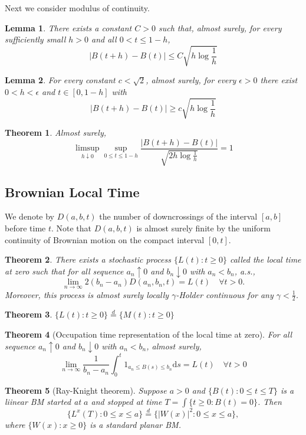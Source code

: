 \documentclass{article}
\newtheorem{Thm}{Theorem}[section]
\newtheorem{Lem}{Lemma}[section]
\theoremstyle{definition}
\renewcommand{\leq}{\leqslant}
\renewcommand{\geq}{\geqslant}
\newcommand{\<}{\left\langle}
\renewcommand{\>}{\right\rangle}
\newcommand{\ep}{{\epsilon}}
\begin{document}
Next we consider modulus of continuity.
\begin{Lem}
    There exists a constant $C>0$ such that, almost surely, for every sufficiently small $h>0$ and all $0<t\leq 1-h$,
    \[|B(t+h)-B(t)|\leq C\sqrt{h\log\frac{1}{h}}\]
\end{Lem}

\begin{Lem}
    For every constant $c<\sqrt{2}$, almost surely, for every $\ep>0$ there exist $0<h<\ep$ and $t\in [0,1-h]$ with 
    \[|B(t+h)-B(t)|\geq c\sqrt{h\log\frac{1}{h}}\]
\end{Lem}

\begin{Thm}
    Almost surely,
    \[\limsup_{h\downarrow 0}\sup_{0\leq t\leq 1-h}\frac{|B(t+h)-B(t)|}{\sqrt{2h\log\frac{1}{h}}}=1\]
\end{Thm}

\subsection{Brownian Local Time}
We denote by $D(a,b,t)$ the number of downcrossings of the interval $[a,b]$ before time $t$.
Note that $D(a,b,t)$ is almost surely finite by the uniform continuity of Brownian motion on the compact interval $[0,t]$.
\begin{Thm}
    There exists a stochastic process $\{L(t):t\geq 0\}$ called the local time at zero such that for all sequence $a_n\uparrow 0$ and $b_n\downarrow 0$ with 
    $a_n<b_n$, a.s.,
    \[\lim_{n\to\infty} 2(b_n-a_n)D(a_n,b_n,t)=L(t) \quad\forall t>0.\]
    Moreover, this process is almost surely locally $\gamma$-Holder continuous for any $\gamma<\frac{1}{2}$.
\end{Thm}

\begin{Thm}
    $\{L(t):t\geq 0\}\overset{d}{=}  \{M(t):t\geq 0\}$
\end{Thm}

\begin{Thm}[Occupation time representation of the local time at zero]
    For all sequence $a_n\uparrow 0$ and $b_n\downarrow 0$ with $a_n<b_n$, almost surely,
    \[\lim_{n\to\infty}\frac{1}{b_n-a_n}\int_0^t 1_{a_n\leq B(s)\leq b_n}\mathrm{d}s=L(t)\quad \forall t>0 \]
\end{Thm}


\begin{Thm}[Ray-Knight theorem]
    Suppose $a>0$ and $\{B(t):0\leq t\leq T\}$ is a liinear BM started at $a$ and stopped at time $T=\int\{t\geq 0:B(t)=0\}$.
    Then \[\{L^x(T):0\leq x\leq a\}\overset{d}{=}\{|W(x)|^2:0\leq x\leq a\},\]
    where $\{W(x):x\geq 0\}$ is a standard planar BM.
\end{Thm}
\end{document}
